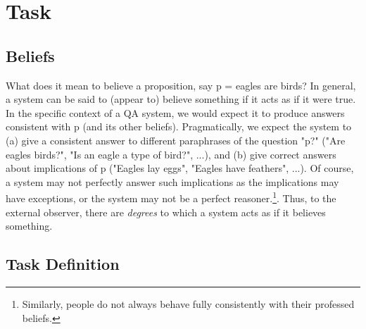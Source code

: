 \documentclass[11pt]{article}
\newcommand{\eat}[1]{}
\newcommand{\red}[1]{\textcolor{red}{#1}}
\begin{document}
\section{Task}

\subsection{Beliefs}

What does it mean to believe a proposition, say p = eagles are birds? In general, a system can
be said to (appear to) believe something if it acts as if it were true. In the specific
context of a QA system, we would expect it to produce answers consistent with p (and
its other beliefs). Pragmatically, we expect the system to (a) give a consistent answer to
different paraphrases of the question "p?" ("Are eagles birds?", "Is an eagle a type of bird?", ...),
and (b) give correct answers about implications of p ("Eagles lay eggs", "Eagles have feathers", ...).
Of course, a system may not perfectly answer such implications as the implications
may have exceptions, or the system may not be a perfect reasoner.\footnote{Similarly,
people do not always behave fully consistently with their professed beliefs.}.
Thus, to the external observer, there are {\it degrees} to which a system acts as if it
believes something.

\eat{
\red{Possibly delete this paragraph if too repetitive.} 
As has been shown elsewhere, language models (LM) can be inconsistent in their answers,
suggesting they have a rather weak notion of belief, in the sense described above.
To strengthen this, we add a dynamic memory component - the BeliefBank - on top of
the model to track and modify beliefs. We use the phrase ``the {\bf system}'' to refer
to the combined model plus belief bank. Our goal is to create a system with
a stronger notion of belief (i.e., more consistent and accurate) than the underlying LM inside it.
}

\subsection{Task Definition}
\end{document}
